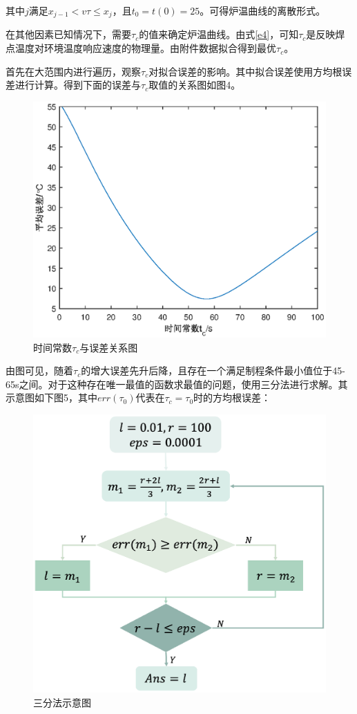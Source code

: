\documentclass[a4paper,12pt]{ctexart} %
\begin{document}
	其中$j$满足$x_{j-1} <v\tau \leqslant x_{j}$，且$t_0=t(0)=25$。可得炉温曲线的离散形式。\par
	在其他因素已知情况下，需要$\tau_c$的值来确定炉温曲线。由式\ref{e4}，可知$\tau_c$是反映焊点温度对环境温度响应速度的物理量。由附件数据拟合得到最优$\tau_c$。\par
	首先在大范围内进行遍历，观察$\tau_c$对拟合误差的影响。其中拟合误差使用方均根误差进行计算。得到下面的误差与$\tau_c$取值的关系图如图4。\par
	\begin{figure}[H]
		\centering
		\includegraphics[scale=0.6]{Q1-3}
		\caption{时间常数$\tau_c$与误差关系图}
	\end{figure}\par
	由图可见，随着$\tau_c$的增大误差先升后降，且存在一个满足制程条件最小值位于45-65s之间。对于这种存在唯一最值的函数求最值的问题，使用三分法进行求解。其示意图如下图5，其中$err(\tau_0)$代表在$\tau_c = \tau_0$时的方均根误差：
	\begin{figure}[H]
		\centering
		\includegraphics[scale=0.45]{Q1-4}
		\caption{三分法示意图}
	\end{figure}\par
\end{document}
